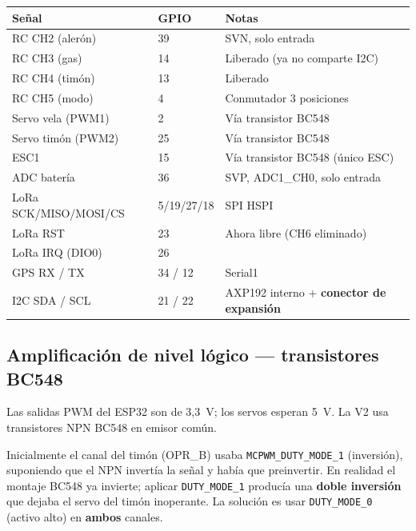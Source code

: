 \documentclass[12pt,a4paper]{article}
\begin{document}
\begin{longtable}{C{3cm} C{1.6cm} L{7.5cm}}
  \toprule
  \textcolor{tableheadfg}{\textbf{Se\~nal}} &
  \textcolor{tableheadfg}{\textbf{GPIO}} &
  \textcolor{tableheadfg}{\textbf{Notas}} \\
  \midrule
  \endhead
  \bottomrule
  \endfoot
  RC CH2 (aler\'on) & 39 & SVN, solo entrada \\[2pt]
  RC CH3 (gas) & 14 & Liberado (ya no comparte I2C) \\[2pt]
  RC CH4 (tim\'on) & 13 & Liberado \\[2pt]
  RC CH5 (modo) & 4 & Conmutador 3 posiciones \\[2pt]
  Servo vela (PWM1) & 2 & V\'ia transistor BC548 \\[2pt]
  Servo tim\'on (PWM2) & 25 & V\'ia transistor BC548 \\[2pt]
  ESC1 & 15 & V\'ia transistor BC548 (\'unico ESC) \\[2pt]
  ADC bater\'ia & 36 & SVP, ADC1\_CH0, solo entrada \\[2pt]
  LoRa SCK/MISO/MOSI/CS & 5/19/27/18 & SPI HSPI \\[2pt]
  LoRa RST & 23 & Ahora libre (CH6 eliminado) \\[2pt]
  LoRa IRQ (DIO0) & 26 & \\[2pt]
  GPS RX / TX & 34 / 12 & Serial1 \\[2pt]
  I2C SDA / SCL & 21 / 22 & AXP192 interno + \textbf{conector de expansi\'on} \\
\end{longtable}

\subsection{Amplificaci\'on de nivel l\'ogico --- transistores BC548}
\label{subsec:bc548}

Las salidas PWM del ESP32 son de 3,3~V; los servos esperan 5~V. La V2 usa
transistores NPN BC548 en emisor com\'un.

\begin{infobox}
  Inicialmente el canal del tim\'on (OPR\_B) usaba \texttt{MCPWM\_DUTY\_MODE\_1}
  (inversi\'on), suponiendo que el NPN invert\'ia la se\~nal y hab\'ia que
  preinvertir. En realidad el montaje BC548 ya invierte; aplicar
  \texttt{DUTY\_MODE\_1} produc\'ia una \textbf{doble inversi\'on} que dejaba el
  servo del tim\'on inoperante. La soluci\'on es usar \texttt{DUTY\_MODE\_0}
  (activo alto) en \textbf{ambos} canales.
\end{infobox}
\end{document}
